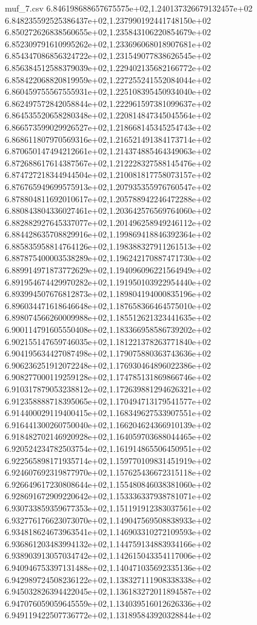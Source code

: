 \begin{filecontents*}{muf_7.csv}
6.846198688657675575e+02,1.240137326679132457e+02
6.848235592525386437e+02,1.237990192441748150e+02
6.850272626838560655e+02,1.235843106220854679e+02
6.852309791610995262e+02,1.233696068018907681e+02
6.854347086856324722e+02,1.231549077838626545e+02
6.856384512588379039e+02,1.229402135682166772e+02
6.858422068820819959e+02,1.227255241552084044e+02
6.860459755567555931e+02,1.225108395450934040e+02
6.862497572842058844e+02,1.222961597381099637e+02
6.864535520658280348e+02,1.220814847345045564e+02
6.866573599029926527e+02,1.218668145345254743e+02
6.868611807970569316e+02,1.216521491384173714e+02
6.870650147494212661e+02,1.214374885464349063e+02
6.872688617614387567e+02,1.212228327588145476e+02
6.874727218344944504e+02,1.210081817758073157e+02
6.876765949699575913e+02,1.207935355976760547e+02
6.878804811692010617e+02,1.205788942246472288e+02
6.880843804336027461e+02,1.203642576569764060e+02
6.882882927645337077e+02,1.201496258949246112e+02
6.884428635708829916e+02,1.199869418846392364e+02
6.885835958814764126e+02,1.198388327911261513e+02
6.887875400003538289e+02,1.196242170887471730e+02
6.889914971873772629e+02,1.194096096221564949e+02
6.891954674429970282e+02,1.191950103922954440e+02
6.893994507676812873e+02,1.189804194000835196e+02
6.896034471618646648e+02,1.187658366464575010e+02
6.898074566260009988e+02,1.185512621323441635e+02
6.900114791605550408e+02,1.183366958586739202e+02
6.902155147659746035e+02,1.181221378263771840e+02
6.904195634427087498e+02,1.179075880363743636e+02
6.906236251912072248e+02,1.176930464896022386e+02
6.908277000119259128e+02,1.174785131869866746e+02
6.910317879053238812e+02,1.172639881294626321e+02
6.912358888718395065e+02,1.170494713179541577e+02
6.914400029119400415e+02,1.168349627533907551e+02
6.916441300260750040e+02,1.166204624366910139e+02
6.918482702146920928e+02,1.164059703688044465e+02
6.920524234782503754e+02,1.161914865506450951e+02
6.922565898171935714e+02,1.159770109831451919e+02
6.924607692319877970e+02,1.157625436672315118e+02
6.926649617230808644e+02,1.155480846038381060e+02
6.928691672909220642e+02,1.153336337938781071e+02
6.930733859359677353e+02,1.151191912383037561e+02
6.932776176623073070e+02,1.149047569508838933e+02
6.934818624673963541e+02,1.146903310272109593e+02
6.936861203483994132e+02,1.144759134883934166e+02
6.938903913057034742e+02,1.142615043354117006e+02
6.940946753397131488e+02,1.140471035692335136e+02
6.942989724508236122e+02,1.138327111908338338e+02
6.945032826394422045e+02,1.136183272011894587e+02
6.947076059059645559e+02,1.134039516012626336e+02
6.949119422507736772e+02,1.131895843920328844e+02

\end{filecontents*}
